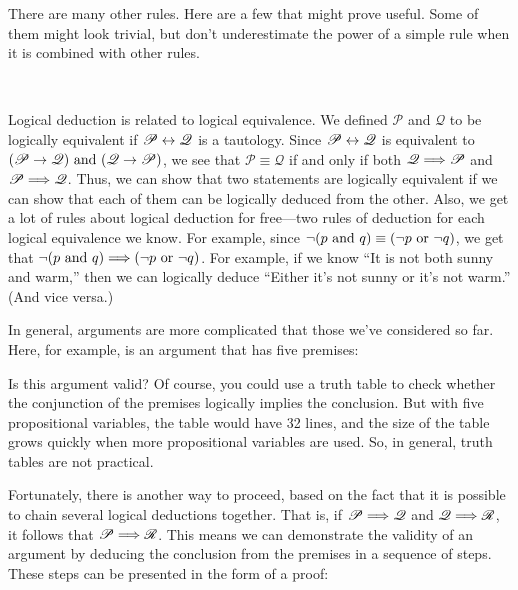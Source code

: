 There are many other rules.  Here are a few that might prove useful.
Some of them might look trivial, but don't underestimate the power
of a simple rule when it is combined with other rules.
\begin{center}
\mbox{
\qquad
{}\qquad
{}\qquad
{}
}
\end{center}


Logical deduction is related to logical equivalence.
We defined $\mathscr{P}$ and $\mathscr{Q}$ to be
logically equivalent if $\mathscr{P}\leftrightarrow\mathscr{Q}$ is
a tautology.  Since $\mathscr{P}\leftrightarrow\mathscr{Q}$ is equivalent
to $(\mathscr{P}\rightarrow\mathscr{Q})\text{ and }(\mathscr{Q}\rightarrow\mathscr{P})$,
we see that  $\mathscr{P}\equiv \mathscr{Q}$ if and only if both
$\mathscr{Q}\Longrightarrow\mathscr{P}$ and $\mathscr{P}\Longrightarrow\mathscr{Q}$.
Thus, we can show that two statements are logically equivalent if
we can show that each of them can be logically deduced from the
other.  Also, we get a lot of rules about logical deduction for 
free---two rules of deduction for each logical equivalence we know.  For
example, since $\lnot(p\text{ and } q)\equiv (\lnot p\text{ or } \lnot q)$,
we get that $\lnot(p\text{ and } q)\Longrightarrow (\lnot p\text{ or } \lnot q)$.
For example, if we know  ``It is not both sunny and warm,'' 
then we can logically deduce ``Either it's not sunny or it's not warm.''
(And vice versa.)


\medskip


In general, arguments are more complicated that those we've considered
so far.  Here, for example, is an argument that has five premises:
\begin{center}
\end{center}
Is this argument valid?  Of course, you could use a truth table
to check whether the conjunction of the premises logically implies
the conclusion.  But with five propositional variables, the table
would have 32 lines, and the size of the table grows quickly when
more propositional variables are used.  So, in general, truth
tables are not practical.  

Fortunately, there is another way to proceed, based on the fact that
it is possible to chain several logical deductions together.
That is, if $\mathscr{P}\Longrightarrow\mathscr{Q}$ and
$\mathscr{Q}\Longrightarrow\mathscr{R}$, it follows that
$\mathscr{P}\Longrightarrow\mathscr{R}$.  This means we can demonstrate the
validity of an argument by deducing the conclusion from the
premises in a sequence of steps.  These steps can be presented
in the form of a proof:

